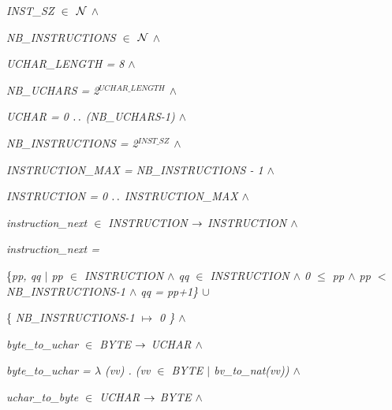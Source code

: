 \begin{sloppypar}
\hspace*{0.20in}\it INST\_SZ  $\in$   $\mbox{${\cal N}$}$   $\land$ 

\hspace*{0.20in}\it NB\_INSTRUCTIONS  $\in$   $\mbox{${\cal N}$}$   $\land$ 

\hspace*{0.20in}\it UCHAR\_LENGTH \rm = \rm 8  $\land$ 

\hspace*{0.20in}\it NB\_UCHARS \rm = \rm 2$^{UCHAR\_LENGTH}$  $\land$ 

\hspace*{0.20in}\it UCHAR \rm = \rm 0 $\mathbin{\ldotp\ldotp}$ \rm (\it NB\_UCHARS\rm -\rm 1\rm )  $\land$ 

\hspace*{0.20in}\it NB\_INSTRUCTIONS \rm = \rm 2$^{INST\_SZ}$  $\land$ 

\hspace*{0.20in}\it INSTRUCTION\_MAX \rm = \it NB\_INSTRUCTIONS \rm - \rm 1  $\land$ 

\hspace*{0.20in}\it INSTRUCTION \rm = \rm 0 $\mathbin{\ldotp\ldotp}$ \it INSTRUCTION\_MAX  $\land$ 

\hspace*{0.20in}\it instruction\_next  $\in$  \it INSTRUCTION  $\rightarrow$  \it INSTRUCTION  $\land$ 

\hspace*{0.20in}\it instruction\_next \rm = 

\hspace*{0.40in}\rm \{\it pp\rm , \it qq  $\mid$  \it pp  $\in$  \it INSTRUCTION  $\land$  \it qq  $\in$  \it INSTRUCTION  $\land$  \rm 0  $\leq$  \it pp  $\land$  \it pp $<$ \it NB\_INSTRUCTIONS\rm -\rm 1  $\land$  \it qq \rm = \it pp\rm +\rm 1\rm \}  $\cup$  

\hspace*{0.40in}\rm \{ \it NB\_INSTRUCTIONS\rm -\rm 1  $\mapsto$  \rm 0 \rm \}  $\land$ 

\hspace*{0.20in}\it byte\_to\_uchar  $\in$  \it BYTE  $\rightarrow$  \it UCHAR  $\land$ 

\hspace*{0.20in}\it byte\_to\_uchar \rm =  $\lambda$  \rm (\it vv\rm ) \rm . \rm (\it vv  $\in$  \it BYTE  $\mid$  \it bv\_to\_nat\rm (\it vv\rm )\rm )  $\land$ 

\hspace*{0.20in}\it uchar\_to\_byte  $\in$  \it UCHAR  $\rightarrow$  \it BYTE  $\land$ 


\end{sloppypar}
